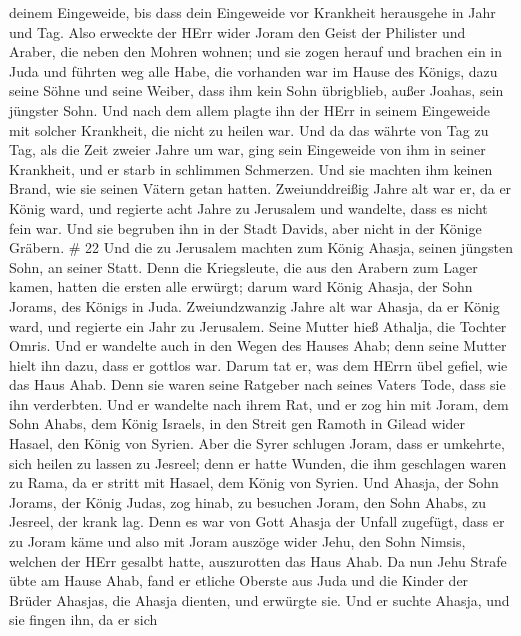 deinem Eingeweide, bis dass dein Eingeweide vor Krankheit herausgehe in
Jahr und Tag.  Also erweckte der HErr wider Joram den Geist
der Philister und Araber, die neben den Mohren wohnen;  und
sie zogen herauf und brachen ein in Juda und führten weg alle Habe, die
vorhanden war im Hause des Königs, dazu seine Söhne und seine Weiber,
dass ihm kein Sohn übrigblieb, außer Joahas, sein jüngster Sohn.
 Und nach dem allem plagte ihn der HErr in seinem
Eingeweide mit solcher Krankheit, die nicht zu heilen war. 
Und da das währte von Tag zu Tag, als die Zeit zweier Jahre um war, ging
sein Eingeweide von ihm in seiner Krankheit, und er starb in schlimmen
Schmerzen. Und sie machten ihm keinen Brand, wie sie seinen Vätern getan
hatten.  Zweiunddreißig Jahre alt war er, da er König ward,
und regierte acht Jahre zu Jerusalem und wandelte, dass es nicht fein
war. Und sie begruben ihn in der Stadt Davids, aber nicht in der Könige
Gräbern. \# 22  Und die zu Jerusalem machten zum König
Ahasja, seinen jüngsten Sohn, an seiner Statt. Denn die Kriegsleute, die
aus den Arabern zum Lager kamen, hatten die ersten alle erwürgt; darum
ward König Ahasja, der Sohn Jorams, des Königs in Juda. 
Zweiundzwanzig Jahre alt war Ahasja, da er König ward, und regierte ein
Jahr zu Jerusalem. Seine Mutter hieß Athalja, die Tochter Omris.
 Und er wandelte auch in den Wegen des Hauses Ahab; denn
seine Mutter hielt ihn dazu, dass er gottlos war.  Darum tat
er, was dem HErrn übel gefiel, wie das Haus Ahab. Denn sie waren seine
Ratgeber nach seines Vaters Tode, dass sie ihn verderbten. 
Und er wandelte nach ihrem Rat, und er zog hin mit Joram, dem Sohn
Ahabs, dem König Israels, in den Streit gen Ramoth in Gilead wider
Hasael, den König von Syrien. Aber die Syrer schlugen Joram,
 dass er umkehrte, sich heilen zu lassen zu Jesreel; denn er
hatte Wunden, die ihm geschlagen waren zu Rama, da er stritt mit Hasael,
dem König von Syrien. Und Ahasja, der Sohn Jorams, der König Judas, zog
hinab, zu besuchen Joram, den Sohn Ahabs, zu Jesreel, der krank lag.
 Denn es war von Gott Ahasja der Unfall zugefügt, dass er zu
Joram käme und also mit Joram auszöge wider Jehu, den Sohn Nimsis,
welchen der HErr gesalbt hatte, auszurotten das Haus Ahab. 
Da nun Jehu Strafe übte am Hause Ahab, fand er etliche Oberste aus Juda
und die Kinder der Brüder Ahasjas, die Ahasja dienten, und erwürgte sie.
 Und er suchte Ahasja, und sie fingen ihn, da er sich

